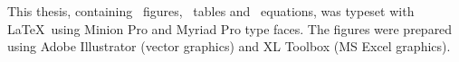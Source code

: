 \pagestyle{plain}
\vspace*{\fill}
This thesis, containing \totalfigures\ figures,  \totaltables\ tables and \totalequations\ equations, was typeset with \LaTeX\ using Minion Pro and Myriad Pro type faces. The figures were prepared using Adobe Illustrator (vector graphics) and XL Toolbox (MS Excel graphics).